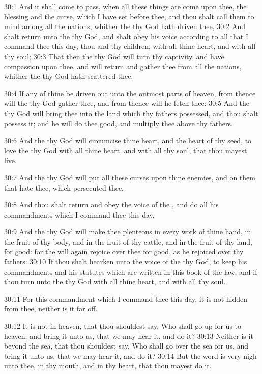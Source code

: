 30:1 And it shall come to pass, when all these things are come upon thee, the blessing and the curse, which I have set before thee, and thou shalt call them to mind among all the nations, whither the \LORD thy God hath driven thee, 30:2 And shalt return unto the \LORD thy God, and shalt obey his voice according to all that I command thee this day, thou and thy children, with all thine heart, and with all thy soul; 30:3 That then the \LORD thy God will turn thy captivity, and have compassion upon thee, and will return and gather thee from all the nations, whither the \LORD thy God hath scattered thee.

30:4 If any of thine be driven out unto the outmost parts of heaven, from thence will the \LORD thy God gather thee, and from thence will he fetch thee: 30:5 And the \LORD thy God will bring thee into the land which thy fathers possessed, and thou shalt possess it; and he will do thee good, and multiply thee above thy fathers.

30:6 And the \LORD thy God will circumcise thine heart, and the heart of thy seed, to love the \LORD thy God with all thine heart, and with all thy soul, that thou mayest live.

30:7 And the \LORD thy God will put all these curses upon thine enemies, and on them that hate thee, which persecuted thee.

30:8 And thou shalt return and obey the voice of the \LORD, and do all his commandments which I command thee this day.

30:9 And the \LORD thy God will make thee plenteous in every work of thine hand, in the fruit of thy body, and in the fruit of thy cattle, and in the fruit of thy land, for good: for the \LORD will again rejoice over thee for good, as he rejoiced over thy fathers: 30:10 If thou shalt hearken unto the voice of the \LORD thy God, to keep his commandments and his statutes which are written in this book of the law, and if thou turn unto the \LORD thy God with all thine heart, and with all thy soul.

30:11 For this commandment which I command thee this day, it is not hidden from thee, neither is it far off.

30:12 It is not in heaven, that thou shouldest say, Who shall go up for us to heaven, and bring it unto us, that we may hear it, and do it?  30:13 Neither is it beyond the sea, that thou shouldest say, Who shall go over the sea for us, and bring it unto us, that we may hear it, and do it?  30:14 But the word is very nigh unto thee, in thy mouth, and in thy heart, that thou mayest do it.

